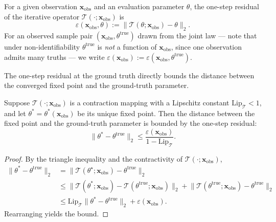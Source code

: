 \begin{definition}
\label{def:one_step_residual}
For a given observation $\mathbf{x}_\mathrm{obs}$ and an evaluation parameter $\theta$, the one-step residual of the iterative operator $\mathcal{T}(\cdot; \mathbf{x}_\mathrm{obs})$ is
\begin{equation}
    \varepsilon(\mathbf{x}_\mathrm{obs},\theta) := \lVert \mathcal{T}(\theta; \mathbf{x}_\mathrm{obs}) - \theta\rVert_2 .
\end{equation}
For an observed sample pair $(\mathbf{x}_\mathrm{obs},\theta^{\mathrm{true}})$ drawn from the joint law --- note that under non-identifiability $\theta^{\mathrm{true}}$ is \emph{not} a function of $\mathbf{x}_\mathrm{obs}$, since one observation admits many truths --- we write $\varepsilon(\mathbf{x}_\mathrm{obs}):=\varepsilon(\mathbf{x}_\mathrm{obs},\theta^{\mathrm{true}})$.
\end{definition}

The one-step residual at the ground truth directly bounds the distance between the converged fixed point and the ground-truth parameter.

\begin{lemma}
\label{lem:error_bound}
Suppose $\mathcal{T}(\cdot; \mathbf{x}_\mathrm{obs})$ is a contraction mapping with a Lipschitz constant $\mathrm{Lip}_\mathcal{T} < 1$, and let $\theta^*=\theta^*(\mathbf{x}_\mathrm{obs})$ be its unique fixed point.
Then the distance between the fixed point and the ground-truth parameter is bounded by the one-step residual:
\begin{equation}
    \lVert\theta^* - \theta^{\mathrm{true}}\rVert_2 \le \frac{\varepsilon(\mathbf{x}_\mathrm{obs})}{1 - \mathrm{Lip}_\mathcal{T}}.
\end{equation}
\end{lemma}

\begin{proof}
By the triangle inequality and the contractivity of $\mathcal{T}(\cdot; \mathbf{x}_\mathrm{obs})$,
\begin{align*}
    \lVert \theta^* - \theta^{\mathrm{true}}\rVert_2 &= \lVert \mathcal{T}(\theta^\star; \mathbf{x}_\mathrm{obs}) - \theta^{\mathrm{true}}\rVert_2 \\
    &\le \lVert \mathcal{T}(\theta^*; \mathbf{x}_\mathrm{obs}) - \mathcal{T}(\theta^{\mathrm{true}}; \mathbf{x}_\mathrm{obs})\rVert_2 + \lVert \mathcal{T}(\theta^{\mathrm{true}}; \mathbf{x}_\mathrm{obs}) - \theta^{\mathrm{true}}\rVert_2 \\
    &\le \mathrm{Lip}_\mathcal{T} \|\theta^* - \theta^{\mathrm{true}}\|_2 + \varepsilon(\mathbf{x}_\mathrm{obs}).
\end{align*}
Rearranging yields the bound.
\end{proof}

